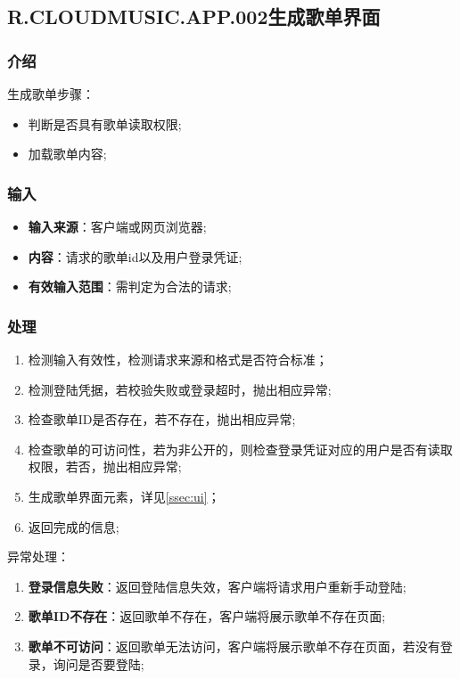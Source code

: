 \subsection{R.CLOUDMUSIC.APP.002生成歌单界面}
\subsubsection{介绍}
生成歌单步骤：
	\begin{itemize}
		\item 判断是否具有歌单读取权限;
		\item 加载歌单内容;
	\end{itemize}
\subsubsection{输入}
	\begin{itemize}
		\item \textbf{输入来源}：客户端或网页浏览器;
		\item \textbf{内容}：请求的歌单id以及用户登录凭证;
		\item \textbf{有效输入范围}：需判定为合法的请求;
	\end{itemize}
\subsubsection{处理}
	\begin{enumerate}
		\item 检测输入有效性，检测请求来源和格式是否符合标准；
		\item 检测登陆凭据，若校验失败或登录超时，抛出相应异常;
		\item 检查歌单ID是否存在，若不存在，抛出相应异常;
		\item 检查歌单的可访问性，若为非公开的，则检查登录凭证对应的用户是否有读取权限，若否，抛出相应异常;
		\item 生成歌单界面元素，详见\ref{ssec:ui}；
		\item 返回完成的信息;
	\end{enumerate}
	\noindent 异常处理：
	\begin{enumerate}
		\item \textbf{登录信息失败}：返回登陆信息失效，客户端将请求用户重新手动登陆;
		\item \textbf{歌单ID不存在}：返回歌单不存在，客户端将展示歌单不存在页面;
		\item \textbf{歌单不可访问}：返回歌单无法访问，客户端将展示歌单不存在页面，若没有登录，询问是否要登陆;
	\end{enumerate}

